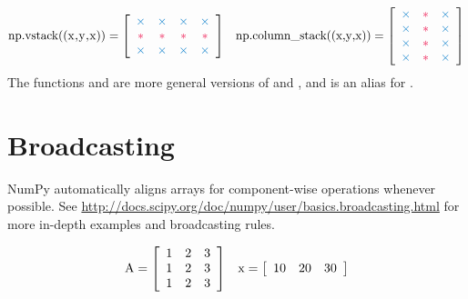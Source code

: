 \begin{align*}
\text{\li{np.vstack((x,y,x))}} =
\left[\begin{array}{cccc}
\textcolor{blue}{\times}&\textcolor{blue}{\times}&\textcolor{blue}{\times}&\textcolor{blue}{\times}\\
\textcolor{red}{*}&\textcolor{red}{*}&\textcolor{red}{*}&\textcolor{red}{*}\\
\textcolor{blue}{\times}&\textcolor{blue}{\times}&\textcolor{blue}{\times}&\textcolor{blue}{\times}
\end{array}\right]
&&
\text{\li{np.column_stack((x,y,x))}} =
\left[\begin{array}{ccc}
\textcolor{blue}{\times}&\textcolor{red}{*}&\textcolor{blue}{\times}\\
\textcolor{blue}{\times}&\textcolor{red}{*}&\textcolor{blue}{\times}\\
\textcolor{blue}{\times}&\textcolor{red}{*}&\textcolor{blue}{\times}\\
\textcolor{blue}{\times}&\textcolor{red}{*}&\textcolor{blue}{\times}
\end{array}\right]
\end{align*}
The functions  and  are more general versions of  and , and  is an alias for .

\section*{Broadcasting} %

NumPy automatically aligns arrays for component-wise operations whenever possible.
See \url{http://docs.scipy.org/doc/numpy/user/basics.broadcasting.html} for more in-depth examples and broadcasting rules.

\begin{align*}
\text{\li{A}} = \left[\begin{array}{ccc}
1 & 2 & 3\\
1 & 2 & 3\\
1 & 2 & 3\\
\end{array}\right]
&&
\text{\li{x}} = \left[\begin{array}{ccc}
10 & 20 & 30
\end{array}\right]
\end{align*}

